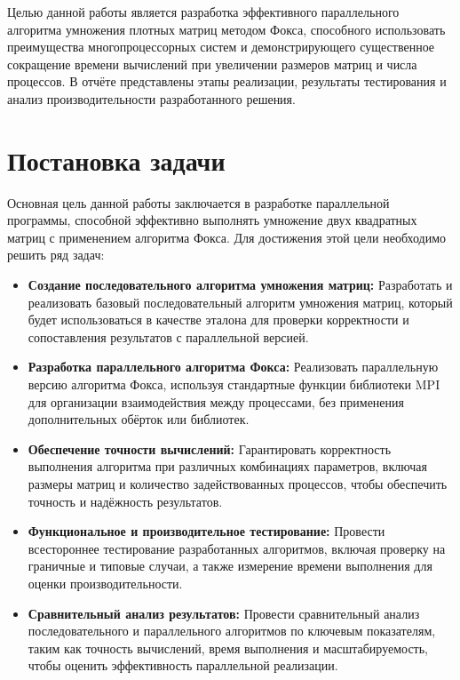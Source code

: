 \documentclass{report}
\begin{document}
Целью данной работы является разработка эффективного параллельного алгоритма умножения плотных матриц методом Фокса, способного использовать преимущества многопроцессорных систем и демонстрирующего существенное сокращение времени вычислений при увеличении размеров матриц и числа процессов. В отчёте представлены этапы реализации, результаты тестирования и анализ производительности разработанного решения.

\newpage

\section*{Постановка задачи}

Основная цель данной работы заключается в разработке параллельной программы, способной эффективно выполнять умножение двух квадратных матриц с применением алгоритма Фокса. Для достижения этой цели необходимо решить ряд задач:

\begin{itemize}
    \item \textbf{Создание последовательного алгоритма умножения матриц:} Разработать и реализовать базовый последовательный алгоритм умножения матриц, который будет использоваться в качестве эталона для проверки корректности и сопоставления результатов с параллельной версией.
    
    \item \textbf{Разработка параллельного алгоритма Фокса:} Реализовать параллельную версию алгоритма Фокса, используя стандартные функции библиотеки MPI для организации взаимодействия между процессами, без применения дополнительных обёрток или библиотек.
    
    \item \textbf{Обеспечение точности вычислений:} Гарантировать корректность выполнения алгоритма при различных комбинациях параметров, включая размеры матриц и количество задействованных процессов, чтобы обеспечить точность и надёжность результатов.
    
    \item \textbf{Функциональное и производительное тестирование:} Провести всестороннее тестирование разработанных алгоритмов, включая проверку на граничные и типовые случаи, а также измерение времени выполнения для оценки производительности.
    
    \item \textbf{Сравнительный анализ результатов:} Провести сравнительный анализ последовательного и параллельного алгоритмов по ключевым показателям, таким как точность вычислений, время выполнения и масштабируемость, чтобы оценить эффективность параллельной реализации.
\end{itemize}
\end{document}
